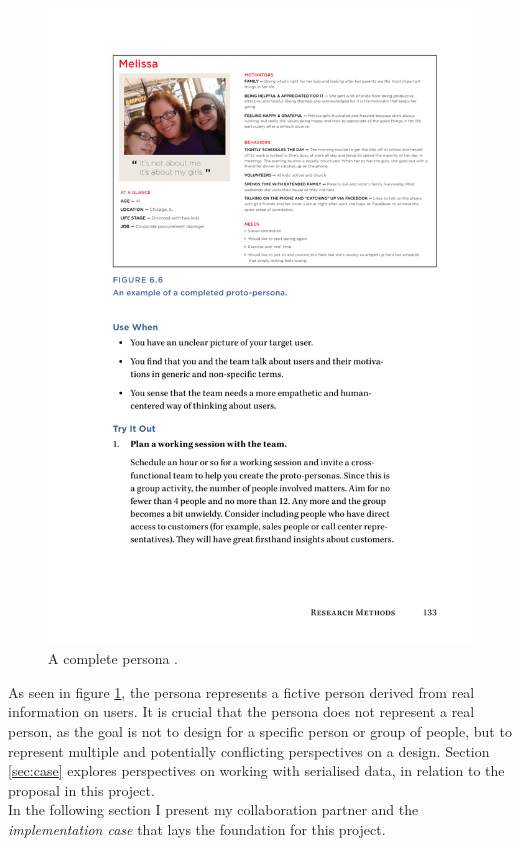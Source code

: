 \documentclass[../report.tex]{subfiles}
\begin{document}
\begin{figure}[H]
\centering
\includegraphics[width=0.9\linewidth]{figures/persona.pdf}
\caption{A complete persona \cite[133]{buley2013user}.}
\label{fig:persona}
\end{figure}

As seen in figure \ref{fig:persona}, the persona represents a fictive person derived from real information on users. It is crucial that the persona does not represent a real person, as the goal is not to design for a specific person or group of people, but to represent multiple and potentially conflicting perspectives on a design. Section \ref{sec:case} explores perspectives on working with serialised data, in relation to the proposal in this project. \\

In the following section I present my collaboration partner and the \textit{implementation case} that lays the foundation for this project.
\end{document}
